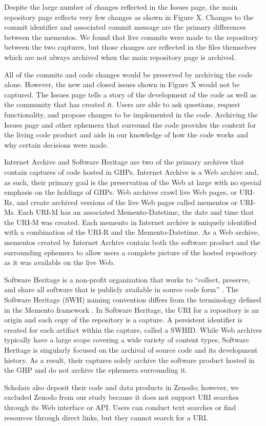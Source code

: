 Despite the large number of changes reflected in the Issues page, the main repository page reflects very few changes as shown in Figure X. Changes to the commit identifier and associated commit message are the primary differences between the mementos. We found that five commits were made to the repository between the two captures, but those changes are reflected in the files themselves which are not always archived when the main repository page is archived. 



All of the commits and code changes would be preserved by archiving the code alone. However, the new and closed issues shown in Figure X would not be captured. The Issues page tells a story of the development of the code as well as the community that has created it. Users are able to ask questions, request functionality, and propose changes to be implemented in the code. Archiving the Issues page and other ephemera that surround the code provides the context for the living code product and aids in our knowledge of how the code works and why certain decisions were made. 

Internet Archive and Software Heritage are two of the primary archives that contain captures of code hosted in GHPs. Internet Archive is a Web archive and, as such, their primary goal is the preservation of the Web at large with no special emphasis on the holdings of GHPs. Web archives crawl live Web pages, or URI-Rs, and create archived versions of the live Web pages called mementos or URI-Ms. Each URI-M has an associated Memento-Datetime, the date and time that the URI-M was created. Each memento in Internet archive is uniquely identified with a combination of the URI-R and the Memento-Datetime. As a Web archive, mementos created by Internet Archive contain both the software product and the surrounding ephemera to allow users a complete picture of the hosted repository as it was available on the live Web.

Software Heritage is a non-profit organization that works to ``collect, preserve, and share all software that is publicly available in source code form'' \cite{swh-mission}. The Software Heritage (SWH) naming convention differs from the terminology defined in the Memento framework \cite{mementoprotocol}. In Software Heritage, the URI for a repository is an origin and each copy of the repository is a capture. A persistent identifier is created for each artifact within the capture, called a SWHID. While Web archives typically have a large scope covering a wide variety of content types, Software Heritage is singularly focused on the archival of source code and its development history. As a result, their captures solely archive the software product hosted in the GHP and do not archive the ephemera surrounding it. 

Scholars also deposit their code and data products in Zenodo; however, we excluded Zenodo from our study because it does not support URI searches through its Web interface or API. Users can conduct text searches or find resources through direct links, but they cannot search for a URI. 